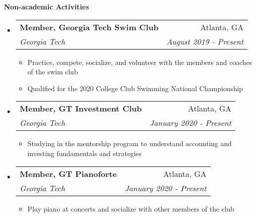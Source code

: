 \documentclass[letterpaper,11pt]{article}
\makeatletter
\newcommand{\resitem}[1]{\item #1 \vspace{-2pt}}
\newcommand{\resheading}[1]{{\large \colorbox{mygrey}{\begin{minipage}{\textwidth}{\textbf{#1 \vphantom{p\^{E}}}}\end{minipage}}}}
\newcommand{\ressubheading}[4]{
\begin{tabular*}{7.0in}{l@{\extracolsep{\fill}}r}
		\textbf{#1} & #2 \\
		\textit{#3} & \textit{#4} \\
\end{tabular*}\vspace{-6pt}}
\makeatother
\begin{document}
\resheading{Non-academic Activities}
\begin{itemize}
\item
    \ressubheading{Member, Georgia Tech Swim Club}{Atlanta, GA}{Georgia Tech}{August 2019 - Present}
    \begin{itemize}
        \resitem{Practice, compete, socialize, and volunteer with the members and coaches of the swim club}
        \resitem{Qualified for the 2020 College Club Swimming National Championship}
    \end{itemize}
\item
    \ressubheading{Member, GT Investment Club}{Atlanta, GA}{Georgia Tech}{January 2020 - Present}
    \begin{itemize}
        \resitem{Studying in the mentorship program to understand accounting and investing fundamentals and strategies}
    \end{itemize}
\item
    \ressubheading{Member, GT Pianoforte}{Atlanta, GA}{Georgia Tech}{January 2020 - Present}
    \begin{itemize}
        \resitem{Play piano at concerts and socialize with other members of the club}
    \end{itemize}
\end{itemize}
\end{document}
